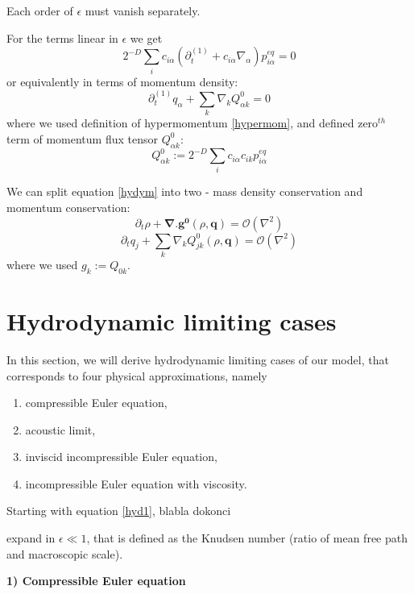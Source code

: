 Each order of $\epsilon$ must vanish separately.

For the terms linear in $\epsilon$ we get
\begin{equation}
2^{-D} \sum_i c_{i\alpha}(\partial_{t}^{(1)} + c_{i\alpha} \nabla_{\alpha}) p_{i\alpha}^{eq} = 0
\end{equation} \label{hydym}
or equivalently in terms of momentum density:
\begin{equation}
\partial_t^{(1)} q_{\alpha} + \sum_k \nabla_k Q_{\alpha k}^0 = 0
\end{equation}
where we used definition of hypermomentum \ref{hypermom},
and defined zero$^{th}$ term of momentum flux tensor $Q_{\alpha k}^0$:
\begin{equation}
Q_{\alpha k}^0 := 2^{-D} \sum_i c_{i\alpha}c_{i k} p_{i\alpha}^{eq}
\end{equation}

We can split equation \ref{hydym} into two -  mass density conservation and momentum conservation:
\begin{equation} \label{hyd1}
\partial_t \rho + \bm{\nabla . g^0}(\rho, \bm{q}) = \mathcal{O}(\nabla^2)
\end{equation}
\begin{equation}
\partial_t q_j + \sum_k \nabla_kQ_{jk}^0(\rho, \bm{q}) = \mathcal{O}(\nabla^2)
\end{equation}
where we used $g_k := Q_{0k}$.

\section{Hydrodynamic limiting cases}
In this section, we will derive hydrodynamic limiting cases of our model, that corresponds to four physical approximations,
namely
\begin{enumerate}
\item compressible Euler equation,
\item acoustic  limit,
\item inviscid incompressible Euler equation,
\item incompressible Euler equation with viscosity.
\end{enumerate}

Starting with equation \ref{hyd1}, blabla dokonci

expand in $\epsilon \ll 1$, that is defined as the Knudsen number (ratio  of mean free path and macroscopic scale).

\bigskip

\textbf{1) Compressible Euler equation}

